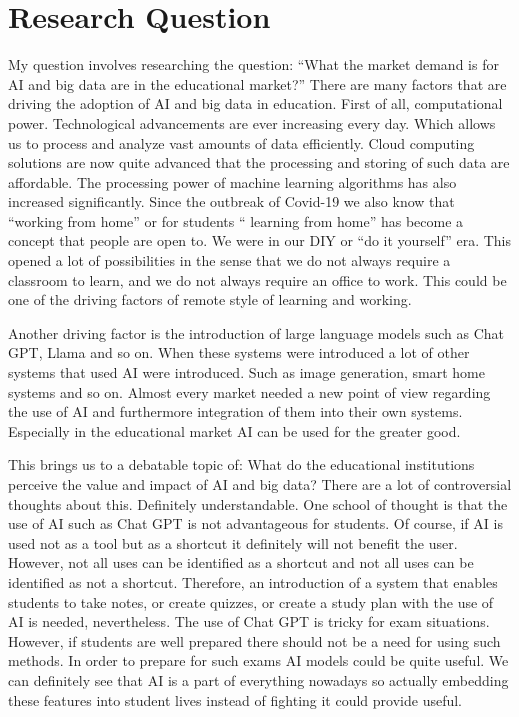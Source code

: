 \documentclass{imc-inf}
\begin{document}
\section{Research Question }
My question involves researching the question: “What the market demand is for AI and big data are in the educational market?” There are many factors that are driving the adoption of AI and big data in education. First of all, computational power. Technological advancements are ever increasing every day. Which allows us to process and analyze vast amounts of data efficiently. Cloud computing solutions are now quite advanced that the processing and storing of such data are affordable. The processing power of machine learning algorithms has also increased significantly. 
Since the outbreak of Covid-19 we also know that “working from home” or for students “ learning from home” has become a concept that people are open to. We were in our DIY or “do it yourself” era. This opened a lot of possibilities in the sense that we do not always require a classroom to learn, and we do not always require an office to work. This could be one of the driving factors of remote style of learning and working. 

Another driving factor is the introduction of large language models such as Chat GPT, Llama and so on. When these systems were introduced a lot of other systems that used AI were introduced. Such as image generation, smart home systems and so on. Almost every market needed a new point of view regarding the use of AI and furthermore integration of them into their own systems. Especially in the educational market AI can be used for the greater good. 

This brings us to a debatable topic of: What do the educational institutions perceive the value and impact of AI and big data? There are a lot of controversial thoughts about this. Definitely understandable. One school of thought is that the use of AI such as Chat GPT is not advantageous for students. Of course, if AI is used not as a tool but as a shortcut it definitely will not benefit the user. However, not all uses can be identified as a shortcut and not all uses can be identified as not a shortcut. Therefore, an introduction of a system that enables students to take notes, or create quizzes, or create a study plan with the use of AI is needed, nevertheless. The use of Chat GPT is tricky for exam situations. However, if students are well prepared there should not be a need for using such methods. In order to prepare for such exams AI models could be quite useful. We can definitely see that AI is a part of everything nowadays so actually embedding these features into student lives instead of fighting it could provide useful. 
\end{document}
